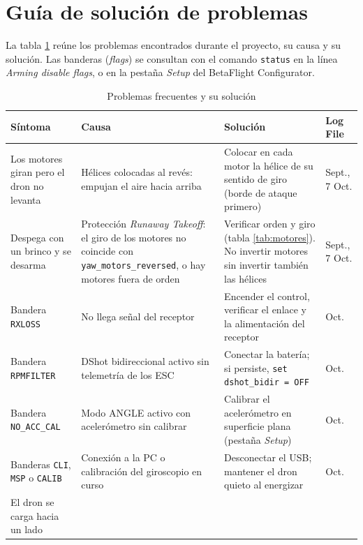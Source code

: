 \documentclass[11pt,letterpaper]{article}
\begin{document}
\section{Guía de solución de problemas}
\label{sec:problemas}
La tabla \ref{tab:problemas} reúne los problemas encontrados durante el proyecto, su causa y su solución. Las banderas (\textit{flags}) se consultan con el comando \texttt{status} en la línea \textit{Arming disable flags}, o en la pestaña \textit{Setup} del BetaFlight Configurator.

\begin{table}[!ht]
\centering
\caption{Problemas frecuentes y su solución}
\label{tab:problemas}
\small
\begin{tabularx}{\textwidth}{@{}>{\raggedright\arraybackslash}p{3.2cm}>{\raggedright\arraybackslash}X>{\raggedright\arraybackslash}X>{\raggedright\arraybackslash}p{2.1cm}@{}}
\toprule
\textbf{Síntoma} & \textbf{Causa} & \textbf{Solución} & \textbf{Log File} \\
\midrule
Los motores giran pero el dron no levanta &
Hélices colocadas al revés: empujan el aire hacia arriba &
Colocar en cada motor la hélice de su sentido de giro (borde de ataque primero) &
Sept., 7 Oct. \\
\addlinespace
Despega con un brinco y se desarma &
Protección \textit{Runaway Takeoff}: el giro de los motores no coincide con \texttt{yaw\_motors\_reversed}, o hay motores fuera de orden &
Verificar orden y giro (tabla \ref{tab:motores}). No invertir motores sin invertir también las hélices &
Sept., 7 Oct. \\
\addlinespace
Bandera \texttt{RXLOSS} &
No llega señal del receptor &
Encender el control, verificar el enlace y la alimentación del receptor &
7 Oct. \\
\addlinespace
Bandera \texttt{RPMFILTER} &
DShot bidireccional activo sin telemetría de los ESC &
Conectar la batería; si persiste, \texttt{set dshot\_bidir = OFF} &
10 Oct. \\
\addlinespace
Bandera \texttt{NO\_ACC\_CAL} &
Modo ANGLE activo con acelerómetro sin calibrar &
Calibrar el acelerómetro en superficie plana (pestaña \textit{Setup}) &
13 Oct. \\
\addlinespace
Banderas \texttt{CLI}, \texttt{MSP} o \texttt{CALIB} &
Conexión a la PC o calibración del giroscopio en curso &
Desconectar el USB; mantener el dron quieto al energizar &
13 Oct. \\
\addlinespace
El dron se carga hacia un lado &

\end{tabularx}
\end{table}
\end{document}
